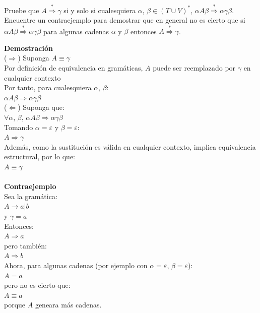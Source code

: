 \documentclass[12pt]{article}
\newcommand{\Aspace}{0.2cm}
\begin{document}
 Pruebe que $A \overset{*}{\Rightarrow} \gamma$ si y solo si cualesquiera $\alpha$, $\beta \in (T \cup V)^{*}$,
$\alpha A \beta \overset{*}{\Rightarrow} \alpha \gamma \beta$. Encuentre un contraejemplo para demostrar que en general no es cierto que si 
$\alpha A \beta \overset{*}{\Rightarrow} \alpha \gamma \beta$ para algunas cadenas $\alpha$ y $\beta$ entonces $A \overset{*}{\Rightarrow} \gamma$.
    \vspace{\Aspace} \par
    { \color{azul} 
        \textbf{Demostración} \\
        ($\Rightarrow$) Suponga $A \equiv \gamma$ \\
        Por definición de equivalencia en gramáticas, $A$ puede ser reemplazado por $\gamma$ en cualquier contexto \\
        Por tanto, para cualesquiera $\alpha$, $\beta$: \\
        $\alpha A \beta \Rightarrow \alpha \gamma \beta$ \\

        \hspace{-0.6cm}($\Leftarrow$) Suponga que: \\
        $\forall \alpha$, $\beta$, $\alpha A \beta \Rightarrow \alpha \gamma \beta$ \\
        Tomando $\alpha = \varepsilon$ y $\beta = \varepsilon$: \\
        $A \Rightarrow \gamma$ \\

        Además, como la sustitución es válida en cualquier contexto, implica equivalencia estructural, por lo que: \\
        $A \equiv \gamma$ \\ \\

        \textbf{Contraejemplo} \\
        Sea la gramática: \\
        $A \rightarrow a | b$ \\
        y $\gamma = a$ \\
        Entonces: \\
        $A \Rightarrow a$ \\
        pero también: \\
        $A \Rightarrow b$ \\

        Ahora, para algunas cadenas (por ejemplo con $\alpha = \varepsilon$, $\beta = \varepsilon$): \\
        $A = a$ \\
        pero no es cierto que: \\
        $A \equiv a$ \\
        porque $A$ geneara más cadenas. \\

}
\end{document}
